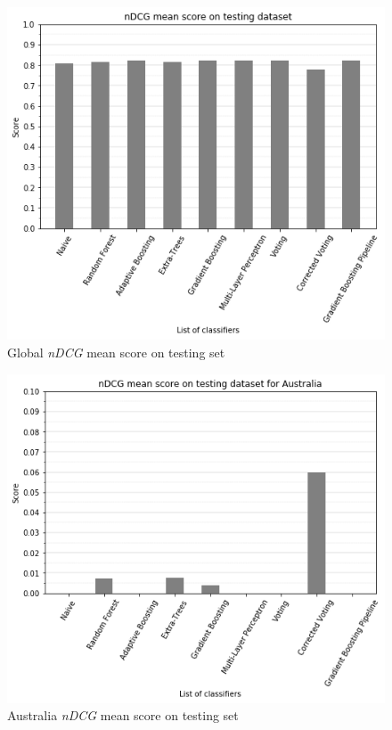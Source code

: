 \documentclass[twocolumn, switch]{article}
\begin{document}
\begin{figure}[H]
\centering
\includegraphics[scale=0.35]{../graphs/ndcg_mean_score_test}
\caption{Global \textit{nDCG} mean score on testing set}
\label{fig:ndcgtest}
\end{figure}

\begin{figure}[H]
\centering
\includegraphics[scale=0.35]{../graphs/ndcg_mean_score_au_test}
\caption{Australia \textit{nDCG} mean score on testing set}
\label{fig:ndcgtestau}
\end{figure}
\end{document}
